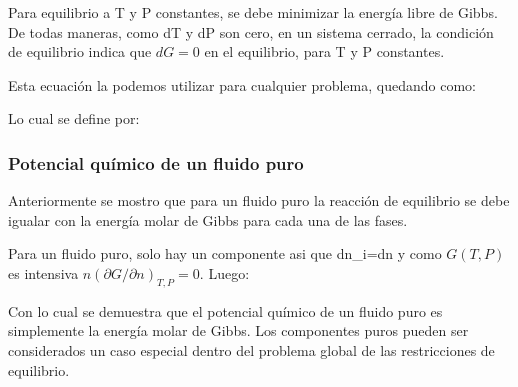 Para equilibrio a T y P constantes, se debe minimizar la energía libre de Gibbs. De todas maneras, como dT y dP son cero, en un sistema cerrado, la condición de equilibrio indica que $dG=0$ en el equilibrio, para T y P constantes.

Esta ecuación la podemos utilizar para cualquier problema, quedando como:



Lo cual se define por:

\subsubsection{Potencial químico de un fluido puro}

Anteriormente se mostro que para un fluido puro la reacción de equilibrio se debe igualar con la energía molar de Gibbs para cada una de las fases.

Para un fluido puro, solo hay un componente asi que dn_i=dn y como $G(T,P)$ es intensiva $n(\partial G/\partial n)_{T,P}=0$. Luego:


Con lo cual se demuestra que el potencial químico de un fluido puro es simplemente la energía molar de Gibbs. Los componentes puros pueden ser considerados un caso especial dentro del problema global de las restricciones de equilibrio.